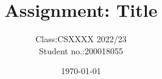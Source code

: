 


\title{Assignment: Title}
\author{
    \begin{tabular}{rl}
        Class:& CSXXXX 2022/23 \\
        Student no.:& 200018055 \\
    \end{tabular}
}
\date{\today}
\maketitle




